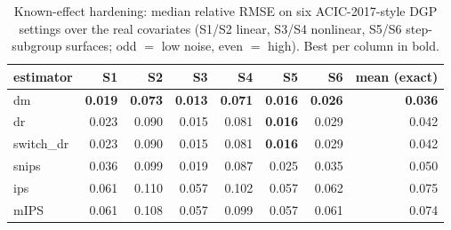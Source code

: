 \begin{table}[t]\centering
\caption{Known-effect hardening: median relative RMSE on six ACIC-2017-style DGP settings over the real  covariates (S1/S2 linear, S3/S4 nonlinear, S5/S6 step-subgroup surfaces; odd $=$ low noise, even $=$ high). Best per column in bold.}
\label{tab:acic-hardening}
\begin{tabular}{lrrrrrrr}
\toprule
estimator & S1 & S2 & S3 & S4 & S5 & S6 & mean (exact) \\
\midrule
dm & \textbf{0.019} & \textbf{0.073} & \textbf{0.013} & \textbf{0.071} & \textbf{0.016} & \textbf{0.026} & \textbf{0.036} \\
dr & 0.023 & 0.090 & 0.015 & 0.081 & \textbf{0.016} & 0.029 & 0.042 \\
switch\_dr & 0.023 & 0.090 & 0.015 & 0.081 & \textbf{0.016} & 0.029 & 0.042 \\
snips & 0.036 & 0.099 & 0.019 & 0.087 & 0.025 & 0.035 & 0.050 \\
ips & 0.061 & 0.110 & 0.057 & 0.102 & 0.057 & 0.062 & 0.075 \\
mIPS & 0.061 & 0.108 & 0.057 & 0.099 & 0.057 & 0.061 & 0.074 \\
\bottomrule
\end{tabular}
\end{table}